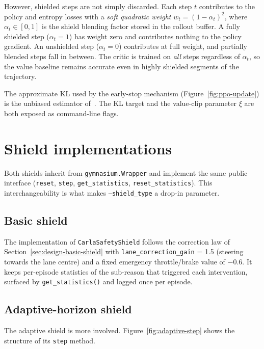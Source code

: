 However, shielded steps are not simply discarded. Each step \(t\) contributes to
the policy and entropy losses with a \emph{soft quadratic weight}
\(w_t = (1 - \alpha_t)^2\), where \(\alpha_t \in [0,1]\) is the shield blending
factor stored in the rollout buffer. A fully shielded step (\(\alpha_t = 1\)) has
weight zero and contributes nothing to the policy gradient. An unshielded step
(\(\alpha_t = 0\)) contributes at full weight, and partially blended steps fall in
between. The critic is trained on \emph{all} steps regardless of \(\alpha_t\),
so the value baseline remains accurate even in highly shielded segments of the
trajectory.

The approximate KL used by the early-stop mechanism (Figure~\ref{fig:ppo-update}) is the
unbiased estimator of~\cite{schulman2020approxkl}. The KL target and the value-clip parameter
\(\xi\) are both exposed as command-line flags.

\section{Shield implementations}\label{sec:impl-shields}

Both shields inherit from \texttt{gymnasium.Wrapper} and implement the same public interface
(\texttt{reset}, \texttt{step}, \texttt{get\_statistics}, \texttt{reset\_statistics}). This
interchangeability is what makes \texttt{--shield\_type} a drop-in parameter.

\subsection{Basic shield}\label{sec:impl-basic}

The implementation of \texttt{CarlaSafetyShield} follows the correction law of
Section~\ref{sec:design-basic-shield} with \texttt{lane\_correction\_gain} = 1.5 (steering
towards the lane centre) and a fixed emergency throttle/brake value of \(-0.6\). It keeps
per-episode statistics of the sub-reason that triggered each intervention, 
surfaced by \texttt{get\_statistics()} and logged once per episode.

\subsection{Adaptive-horizon shield}\label{sec:impl-adaptive}

The adaptive shield is more involved. Figure~\ref{fig:adaptive-step} shows the structure of its
\texttt{step} method.

